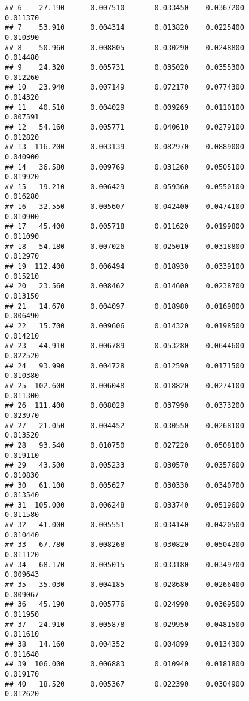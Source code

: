 \documentclass[
]{article}
\begin{document}
\begin{verbatim}
## 6    27.190      0.007510       0.033450    0.0367200          0.011370
## 7    53.910      0.004314       0.013820    0.0225400          0.010390
## 8    50.960      0.008805       0.030290    0.0248800          0.014480
## 9    24.320      0.005731       0.035020    0.0355300          0.012260
## 10   23.940      0.007149       0.072170    0.0774300          0.014320
## 11   40.510      0.004029       0.009269    0.0110100          0.007591
## 12   54.160      0.005771       0.040610    0.0279100          0.012820
## 13  116.200      0.003139       0.082970    0.0889000          0.040900
## 14   36.580      0.009769       0.031260    0.0505100          0.019920
## 15   19.210      0.006429       0.059360    0.0550100          0.016280
## 16   32.550      0.005607       0.042400    0.0474100          0.010900
## 17   45.400      0.005718       0.011620    0.0199800          0.011090
## 18   54.180      0.007026       0.025010    0.0318800          0.012970
## 19  112.400      0.006494       0.018930    0.0339100          0.015210
## 20   23.560      0.008462       0.014600    0.0238700          0.013150
## 21   14.670      0.004097       0.018980    0.0169800          0.006490
## 22   15.700      0.009606       0.014320    0.0198500          0.014210
## 23   44.910      0.006789       0.053280    0.0644600          0.022520
## 24   93.990      0.004728       0.012590    0.0171500          0.010380
## 25  102.600      0.006048       0.018820    0.0274100          0.011300
## 26  111.400      0.008029       0.037990    0.0373200          0.023970
## 27   21.050      0.004452       0.030550    0.0268100          0.013520
## 28   93.540      0.010750       0.027220    0.0508100          0.019110
## 29   43.500      0.005233       0.030570    0.0357600          0.010830
## 30   61.100      0.005627       0.030330    0.0340700          0.013540
## 31  105.000      0.006248       0.033740    0.0519600          0.011580
## 32   41.000      0.005551       0.034140    0.0420500          0.010440
## 33   67.780      0.008268       0.030820    0.0504200          0.011120
## 34   68.170      0.005015       0.033180    0.0349700          0.009643
## 35   35.030      0.004185       0.028680    0.0266400          0.009067
## 36   45.190      0.005776       0.024990    0.0369500          0.011950
## 37   24.910      0.005878       0.029950    0.0481500          0.011610
## 38   14.160      0.004352       0.004899    0.0134300          0.011640
## 39  106.000      0.006883       0.010940    0.0181800          0.019170
## 40   18.520      0.005367       0.022390    0.0304900          0.012620

\end{verbatim}
\end{document}
